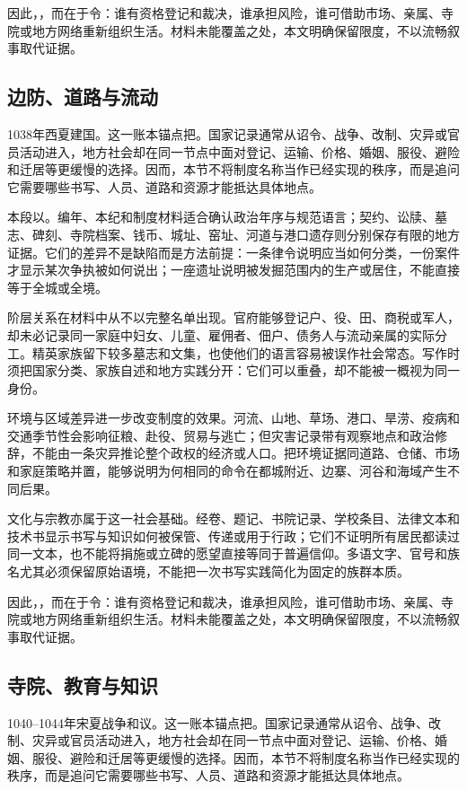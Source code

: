 因此，，而在于令：谁有资格登记和裁决，谁承担风险，谁可借助市场、亲属、寺院或地方网络重新组织生活。材料未能覆盖之处，本文明确保留限度，不以流畅叙事取代证据。

\subsection{边防、道路与流动}

1038年西夏建国。这一账本锚点把。国家记录通常从诏令、战争、改制、灾异或官员活动进入，地方社会却在同一节点中面对登记、运输、价格、婚姻、服役、避险和迁居等更缓慢的选择。因而，本节不将制度名称当作已经实现的秩序，而是追问它需要哪些书写、人员、道路和资源才能抵达具体地点。

本段以。编年、本纪和制度材料适合确认政治年序与规范语言；契约、讼牍、墓志、碑刻、寺院档案、钱币、城址、窑址、河道与港口遗存则分别保存有限的地方证据。它们的差异不是缺陷而是方法前提：一条律令说明应当如何分类，一份案件才显示某次争执被如何说出；一座遗址说明被发掘范围内的生产或居住，不能直接等于全城或全境。

阶层关系在材料中从不以完整名单出现。官府能够登记户、役、田、商税或军人，却未必记录同一家庭中妇女、儿童、雇佣者、佃户、债务人与流动亲属的实际分工。精英家族留下较多墓志和文集，也使他们的语言容易被误作社会常态。写作时须把国家分类、家族自述和地方实践分开：它们可以重叠，却不能被一概视为同一身份。

环境与区域差异进一步改变制度的效果。河流、山地、草场、港口、旱涝、疫病和交通季节性会影响征粮、赴役、贸易与逃亡；但灾害记录带有观察地点和政治修辞，不能由一条灾异推论整个政权的经济或人口。把环境证据同道路、仓储、市场和家庭策略并置，能够说明为何相同的命令在都城附近、边寨、河谷和海域产生不同后果。

文化与宗教亦属于这一社会基础。经卷、题记、书院记录、学校条目、法律文本和技术书显示书写与知识如何被保管、传递或用于行政；它们不证明所有居民都读过同一文本，也不能将捐施或立碑的愿望直接等同于普遍信仰。多语文字、官号和族名尤其必须保留原始语境，不能把一次书写实践简化为固定的族群本质。

因此，，而在于令：谁有资格登记和裁决，谁承担风险，谁可借助市场、亲属、寺院或地方网络重新组织生活。材料未能覆盖之处，本文明确保留限度，不以流畅叙事取代证据。

\subsection{寺院、教育与知识}

1040--1044年宋夏战争和议。这一账本锚点把。国家记录通常从诏令、战争、改制、灾异或官员活动进入，地方社会却在同一节点中面对登记、运输、价格、婚姻、服役、避险和迁居等更缓慢的选择。因而，本节不将制度名称当作已经实现的秩序，而是追问它需要哪些书写、人员、道路和资源才能抵达具体地点。

